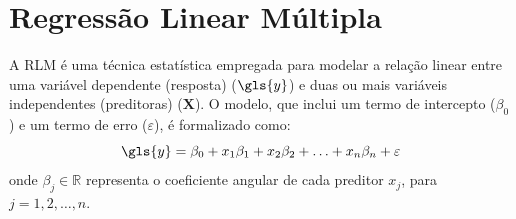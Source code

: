\section{Regressão Linear Múltipla}

A RLM é uma técnica estatística empregada para modelar a relação linear entre uma variável dependente (resposta) ($\gls{y}$) e duas ou mais variáveis independentes (preditoras) ($\mathbf{X}$). O modelo, que inclui um termo de intercepto ($\beta_0$) e um termo de erro ($\varepsilon$), é formalizado como:
\begin{equation}
    \label{eq:rlm-modelo}
    \gls{y} = \beta_0 + x_1\beta_1 + x_2\beta_2 +\ldots+ x_n\beta_n + \varepsilon
\end{equation}
onde $\beta_j \in \mathbb{R}$ representa o coeficiente angular de cada preditor $x_j$, para $j = 1,2,\ldots,n$.

